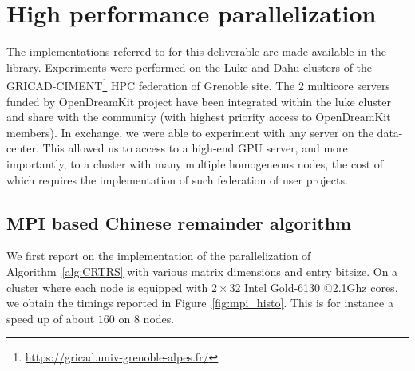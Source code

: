 \section{High performance parallelization}

The implementations referred to for this deliverable are made available in the
\Linbox library. Experiments were performed on the Luke and Dahu clusters of the
GRICAD-CIMENT\footnote{\url{https://gricad.univ-grenoble-alpes.fr/}} HPC
federation of Grenoble site. The 2 multicore servers funded by OpenDreamKit
project have been 
integrated within the luke cluster and share with the community (with  highest
priority access to OpenDreamKit members). In exchange, we were able to
experiment with any server on the data-center. This allowed us to access to a
high-end GPU server, and more importantly, to a cluster with many multiple homogeneous
nodes, the cost of which requires the implementation of such federation of user
projects.


\subsection{MPI based Chinese remainder algorithm}



We first report on the implementation of the parallelization of
Algorithm~\ref{alg:CRTRS} with various matrix dimensions and entry
bitsize. 
On a cluster where each node is equipped
with $2{\times}32$ Intel Gold-6130 @2.1Ghz cores, we obtain the
timings reported in
Figure~\ref{fig:mpi_histo}.
This is for instance a speed up of about $160$ on $8$ nodes.

